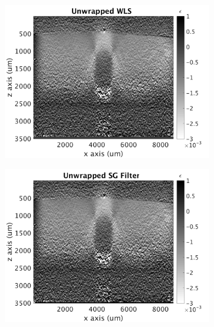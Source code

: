 \begin{figure}[bh!]
	\centering
    \begin{subfigure}{0.49\textwidth}
    	\centering
        \includegraphics[width=\textwidth]{figures/wls_fr40_lr20.png}
	\end{subfigure}
    \begin{subfigure}{0.49\textwidth}
    	\centering
        \includegraphics[width=\textwidth]{figures/uwsg_fr40_lr20.png}
	\end{subfigure}
    \\
    \begin{subfigure}{0.49\textwidth}
    	\centering

\end{subfigure}
\end{figure}
